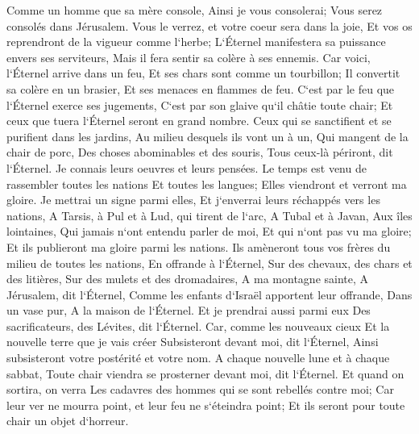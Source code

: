 \verse Comme un homme que sa mère console, Ainsi je vous consolerai; Vous serez consolés dans Jérusalem. 
\verse Vous le verrez, et votre coeur sera dans la joie, Et vos os reprendront de la vigueur comme l`herbe; L`Éternel manifestera sa puissance envers ses serviteurs, Mais il fera sentir sa colère à ses ennemis. 
\verse Car voici, l`Éternel arrive dans un feu, Et ses chars sont comme un tourbillon; Il convertit sa colère en un brasier, Et ses menaces en flammes de feu. 
\verse C`est par le feu que l`Éternel exerce ses jugements, C`est par son glaive qu`il châtie toute chair; Et ceux que tuera l`Éternel seront en grand nombre. 
\verse Ceux qui se sanctifient et se purifient dans les jardins, Au milieu desquels ils vont un à un, Qui mangent de la chair de porc, Des choses abominables et des souris, Tous ceux-là périront, dit l`Éternel. 
\verse Je connais leurs oeuvres et leurs pensées. Le temps est venu de rassembler toutes les nations Et toutes les langues; Elles viendront et verront ma gloire. 
\verse Je mettrai un signe parmi elles, Et j`enverrai leurs réchappés vers les nations, A Tarsis, à Pul et à Lud, qui tirent de l`arc, A Tubal et à Javan, Aux îles lointaines, Qui jamais n`ont entendu parler de moi, Et qui n`ont pas vu ma gloire; Et ils publieront ma gloire parmi les nations. 
\verse Ils amèneront tous vos frères du milieu de toutes les nations, En offrande à l`Éternel, Sur des chevaux, des chars et des litières, Sur des mulets et des dromadaires, A ma montagne sainte, A Jérusalem, dit l`Éternel, Comme les enfants d`Israël apportent leur offrande, Dans un vase pur, A la maison de l`Éternel. 
\verse Et je prendrai aussi parmi eux Des sacrificateurs, des Lévites, dit l`Éternel. 
\verse Car, comme les nouveaux cieux Et la nouvelle terre que je vais créer Subsisteront devant moi, dit l`Éternel, Ainsi subsisteront votre postérité et votre nom. 
\verse A chaque nouvelle lune et à chaque sabbat, Toute chair viendra se prosterner devant moi, dit l`Éternel. 
\verse Et quand on sortira, on verra Les cadavres des hommes qui se sont rebellés contre moi; Car leur ver ne mourra point, et leur feu ne s`éteindra point; Et ils seront pour toute chair un objet d`horreur. 
